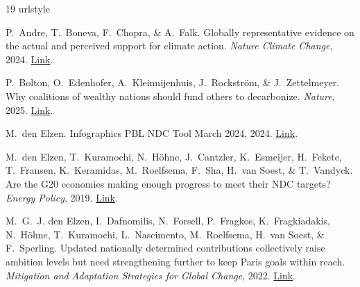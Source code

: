 \documentclass[12pt,english]{article}
\begin{document}
\clearpage
\small
\renewcommand{\url}[1]{\href{#1}{Link}} %
% 

\begin{thebibliography}{19}
\providecommand{\natexlab}[1]{#1}
\providecommand{\url}[1]{\texttt{#1}}
\expandafter\ifx\csname urlstyle\endcsname\relax
  \providecommand{\doi}[1]{doi: #1}\else
  \providecommand{\doi}{doi: \begingroup \urlstyle{rm}\Url}\fi

P.~Andre, T.~Boneva, F.~Chopra, \& A.~Falk.
\newblock Globally representative evidence on the actual and perceived support
  for climate action.
\newblock \emph{Nature Climate Change}, 2024.
\newblock \url{https://www.nature.com/articles/s41558-024-01925-3}.

P.~Bolton, O.~Edenhofer, A.~Kleinnijenhuis, J.~Rockstr{\"o}m, \&
  J.~Zettelmeyer.
\newblock Why coalitions of wealthy nations should fund others to decarbonize.
\newblock \emph{Nature}, 2025.
\newblock \url{https://www.nature.com/articles/d41586-025-00779-9}.

M.~{den Elzen}.
\newblock Infographics {{PBL NDC Tool March}} 2024, 2024.
\newblock \url{https://zenodo.org/records/10875617}.

M.~{den Elzen}, T.~Kuramochi, N.~H{\"o}hne, J.~Cantzler, K.~Esmeijer,
  H.~Fekete, T.~Fransen, K.~Keramidas, M.~Roelfsema, F.~Sha, H.~{van Soest}, \&
  T.~Vandyck.
\newblock Are the {{G20}} economies making enough progress to meet their
  {{NDC}} targets?
\newblock \emph{Energy Policy}, 2019.
\newblock
  \url{https://www.sciencedirect.com/science/article/pii/S030142151830750X}.

M.~G.~J. {den Elzen}, I.~Dafnomilis, N.~Forsell, P.~Fragkos, K.~Fragkiadakis,
  N.~H{\"o}hne, T.~Kuramochi, L.~Nascimento, M.~Roelfsema, H.~{van Soest}, \&
  F.~Sperling.
\newblock Updated nationally determined contributions collectively raise
  ambition levels but need strengthening further to keep {{Paris}} goals within
  reach.
\newblock \emph{Mitigation and Adaptation Strategies for Global Change}, 2022.
\newblock \url{https://doi.org/10.1007/s11027-022-10008-7}.


\end{thebibliography}
\end{document}
